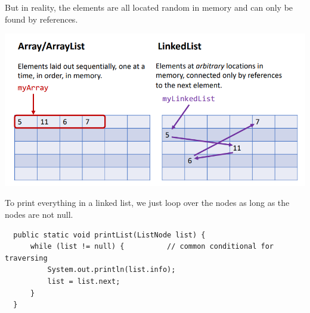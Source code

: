 \begin{definition}
  But in reality, the elements are all located random in memory and can only be found by references. 
  \begin{center}
      \includegraphics[scale=0.3]{img/linked_list_random_memory.png}
  \end{center}
  \end{definition}
  To print everything in a linked list, we just loop over the nodes as long as the nodes are not null. 
  \begin{lstlisting}
  public static void printList(ListNode list) {
      while (list != null) {          // common conditional for traversing 
          System.out.println(list.info); 
          list = list.next; 
      }
  }
  \end{lstlisting}

